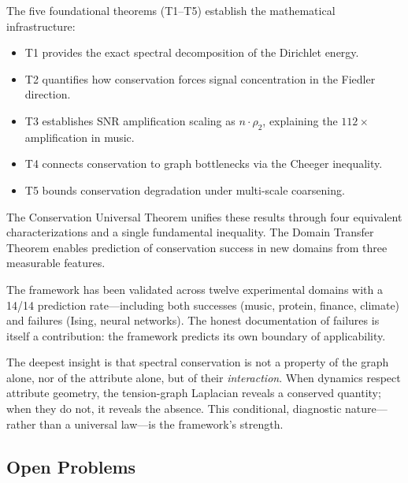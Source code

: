 \documentclass[12pt,letterpaper]{article}
\begin{document}
The five foundational theorems (T1--T5) establish the mathematical infrastructure:
\begin{itemize}
  \item T1 provides the exact spectral decomposition of the Dirichlet energy.
  \item T2 quantifies how conservation forces signal concentration in the Fiedler direction.
  \item T3 establishes SNR amplification scaling as $n \cdot \rho_2$, explaining the $112\times$ amplification in music.
  \item T4 connects conservation to graph bottlenecks via the Cheeger inequality.
  \item T5 bounds conservation degradation under multi-scale coarsening.
\end{itemize}

The Conservation Universal Theorem unifies these results through four equivalent characterizations and a single fundamental inequality. The Domain Transfer Theorem enables prediction of conservation success in new domains from three measurable features.

The framework has been validated across twelve experimental domains with a 14/14 prediction rate---including both successes (music, protein, finance, climate) and failures (Ising, neural networks). The honest documentation of failures is itself a contribution: the framework predicts its own boundary of applicability.

The deepest insight is that spectral conservation is not a property of the graph alone, nor of the attribute alone, but of their \emph{interaction}. When dynamics respect attribute geometry, the tension-graph Laplacian reveals a conserved quantity; when they do not, it reveals the absence. This conditional, diagnostic nature---rather than a universal law---is the framework's strength.

\subsection*{Open Problems}
\end{document}
